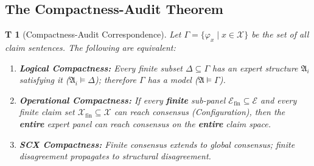 \documentclass[12pt,a4paper]{article}
\newtheorem{theorem}Theorem[section]
\theoremstyle{remark}
\newcommand{\ExpertSet}{\mathcal{E}}
\newcommand{\ClaimSpace}{\mathcal{X}}
\newcommand{\Struct}{\mathfrak{A}}
\begin{document}
\subsection{The Compactness-Audit Theorem}
\begin{theorem}[Compactness-Audit Correspondence]\label{thm:compactness_audit}
Let \(\Gamma = \{\varphi_x \mid x \in \ClaimSpace\}\) be the set of all claim sentences. The following are equivalent:
\begin{enumerate}[label=(\roman*),itemsep=3pt]
    \item \textbf{Logical Compactness:} Every finite subset \(\Delta \subseteq \Gamma\) has an expert structure \(\Struct_i\) satisfying it (\(\Struct_i \models \Delta\)); therefore \(\Gamma\) has a model (\(\Struct \models \Gamma\)).
    \item \textbf{Operational Compactness:} If every \textbf{finite} sub-panel \(\ExpertSet_{\mathrm{fin}} \subseteq \ExpertSet\) and every finite claim set \(\ClaimSpace_{\mathrm{fin}} \subseteq \ClaimSpace\) can reach consensus (Configuration), then the \textbf{entire} expert panel can reach consensus on the \textbf{entire} claim space.
    \item \textbf{SCX Compactness:} Finite consensus extends to global consensus; finite disagreement propagates to structural disagreement.
\end{enumerate}
\end{theorem}
\end{document}
